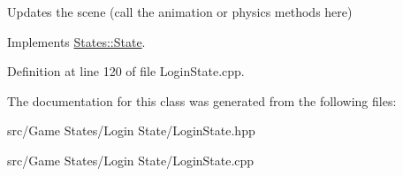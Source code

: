 Updates the scene (call the animation or physics methods here) 

\begin{DoxyVerb}\end{DoxyVerb}
 

Implements \mbox{\hyperlink{class_states_1_1_state_ab8e935def8138e0b917c3228a29904e4}{States\+::\+State}}.



Definition at line 120 of file Login\+State.\+cpp.


\begin{DoxyCode}{0}

\end{DoxyCode}


The documentation for this class was generated from the following files\+:\begin{DoxyCompactItemize}
\item 
src/\+Game States/\+Login State/Login\+State.\+hpp\item 
src/\+Game States/\+Login State/Login\+State.\+cpp\end{DoxyCompactItemize}
